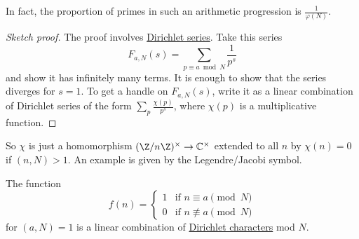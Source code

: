 \documentclass{article}
\begin{document}

In fact, the proportion of primes in such an arithmetic progression is $\frac{1}{\varphi(N)}$.
\begin{proof}[Sketch proof]
    The proof involves \hyperlink{def:dirichlet}{Dirichlet series}. Take this series
    \begin{equation*}
        F_{a,N}(s) = \sum_{p \equiv a \bmod{N}} \frac{1}{p^s}
    \end{equation*}
    and show it has infinitely many terms. It is enough to show that the series diverges for $s=1$.
    To get a handle on $F_{a,N}(s)$, write it as a linear combination of Dirichlet series of the form $\sum_p \frac{\chi(p)}{p^s}$, where $\chi(p)$ is a multiplicative function.
\end{proof}

So $\chi$ is just a homomorphism $(\Z/n\Z)^\times \to \mathbb{C}^\times$ extended to all $n$ by $\chi(n) = 0$ if $(n, N)>1$.
An example is given by the Legendre/Jacobi symbol.

\begin{fact}
    The function
    \begin{equation*}
        f(n) =
        \begin{cases}
            1 & \text{if } n\equiv a \pmod{N} \\
            0 & \text{if } n\not\equiv a \pmod{N}
        \end{cases}
    \end{equation*}
    for $(a,N)=1$ is a linear combination of \hyperlink{def:char}{Dirichlet characters} mod $N$.
\end{fact}
\end{document}
